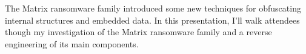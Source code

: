 \def\abstracttitle{Enter the Matrix (Ransomware)}
\def\abstractcomment{Lightning Talk}
\def\abstractowner{Luca Nagy}

\thispagestyle{abstract}

The Matrix ransomware family introduced some new techniques for obfuscating internal structures and embedded data. In this presentation, I'll walk attendees though my investigation of the Matrix ransomware family and a reverse engineering of its main components.\\
